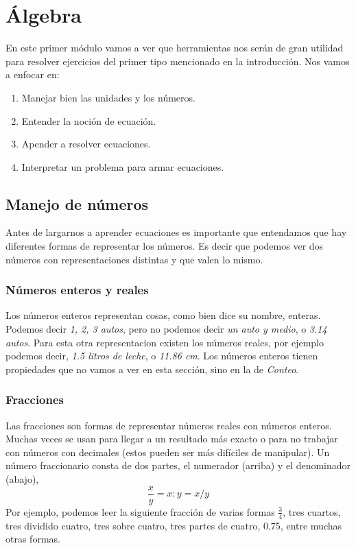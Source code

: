 \documentclass{article}
\begin{document}
\newpage

\section{Álgebra}
\begin{normalsize}
En este primer módulo vamos a ver que herramientas nos serán de gran utilidad para resolver ejercicios del primer tipo mencionado en la introducción.
Nos vamos a enfocar en:
\begin{enumerate}
	\item Manejar bien las unidades y los números.
	\item Entender la noción de ecuación.
	\item Apender a resolver ecuaciones.
	\item Interpretar un problema para armar ecuaciones.
\end{enumerate}
\end{normalsize}

\subsection{Manejo de números}
\begin{normalsize}
Antes de largarnos a aprender ecuaciones es importante que entendamos que hay diferentes formas de representar los números. Es decir que podemos ver dos números con representaciones distintas y que valen lo mismo.
\end{normalsize}

\subsubsection*{Números enteros y reales}
\begin{normalsize}
Los números enteros representan cosas, como bien dice su nombre, enteras. Podemos decir \textit{1, 2, 3 autos}, pero no podemos decir \textit{un auto y medio}, o \textit{3.14 autos}. Para esta otra representacion existen los números reales, por ejemplo podemos decir, \textit{1.5 litros de leche}, o \textit{11.86 cm}.
Los números enteros tienen propiedades que no vamos a ver en esta sección, sino en la de \textit{Conteo}.
\end{normalsize}

\subsubsection*{Fracciones}
\begin{normalsize}
Las fracciones son formas de representar números reales con números enteros. Muchas veces se usan para llegar a un resultado más exacto o para no trabajar con números con decimales (estos pueden ser más difíciles de manipular). Un número fraccionario consta de dos partes, el numerador (arriba) y el denominador (abajo),
\[\frac{x}{y}=x:y=x/y\]
Por ejemplo, podemos leer la siguiente fracción de varias formas $\frac{3}{4}$, tres cuartos, tres dividido cuatro, tres sobre cuatro, tres partes de cuatro, 0.75, entre muchas otras formas.
\\
\end{normalsize}
\end{document}

